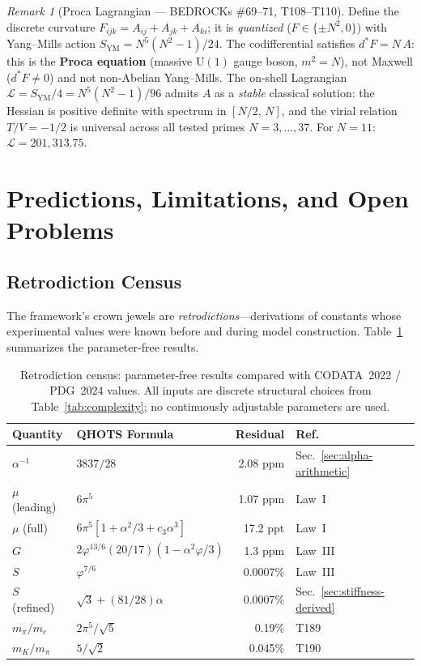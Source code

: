 \documentclass[aps,prd,twocolumn,superscriptaddress,floatfix,nofootinbib]{revtex4-2}
\theoremstyle{definition}
\theoremstyle{remark}
\newtheorem{remark}[theorem]{Remark}
\newcommand{\vp}{\varphi}
\begin{document}
\begin{remark}[Proca Lagrangian --- BEDROCKs \#69--71, T108--T110]
\label{rem:proca}
Define the discrete curvature $F_{ijk}=A_{ij}+A_{jk}+A_{ki}$; it is \emph{quantized} ($F\in\{{\pm}N^2,0\}$) with Yang--Mills action $S_{\mathrm{YM}}=N^5(N^2{-}1)/24$.  The codifferential satisfies $d^*F=N\,A$: this is the \textbf{Proca equation} (massive $\mathrm{U}(1)$ gauge boson, $m^2{=}N$), not Maxwell ($d^*F{\neq}0$) and not non-Abelian Yang--Mills.  The on-shell Lagrangian $\mathcal{L}=S_{\mathrm{YM}}/4=N^5(N^2{-}1)/96$ admits $A$ as a \emph{stable} classical solution: the Hessian is positive definite with spectrum in $[N/2,\,N]$, and the virial relation $T/V=-1/2$ is universal across all tested primes $N=3,\ldots,37$.  For $N{=}11$: $\mathcal{L}=201{,}313.75$.
\end{remark}

\section{Predictions, Limitations, and Open Problems}
\label{sec:predictions-limitations}

\subsection{Retrodiction Census}

The framework's crown jewels are \emph{retrodictions}---derivations of
constants whose experimental values were known before and during model
construction.  Table~\ref{tab:retrodiction-census} summarizes the
parameter-free results.

\begin{table}[ht]
\centering
\caption{Retrodiction census: parameter-free results compared with
  CODATA~2022 / PDG~2024 values.  All inputs are discrete structural
  choices from Table~\ref{tab:complexity}; no continuously adjustable
  parameters are used.}
\label{tab:retrodiction-census}
\begin{tabular}{llrl}
\toprule
Quantity & QHOTS Formula & Residual & Ref.\ \\
\midrule
$\alpha^{-1}$ & $3837/28$ & 2.08 ppm & Sec.~\ref{sec:alpha-arithmetic} \\
$\mu$ (leading) & $6\pi^5$ & 1.07 ppm & Law~I \\
$\mu$ (full) & $6\pi^5[1+\alpha^2/3+c_3\alpha^3]$ & 17.2 ppt & Law~I \\
$G$ & $2\vp^{13/6}(20/17)(1{-}\alpha^2\vp/3)$ & 1.3 ppm & Law~III \\
$S$ & $\vp^{7/6}$ & 0.0007\% & Law~III \\
$S$ (refined) & $\sqrt{3}+(81/28)\alpha$ & 0.0007\% & Sec.~\ref{sec:stiffness-derived} \\
$m_\pi/m_e$ & $2\pi^5/\sqrt{5}$ & 0.19\% & T189 \\
$m_K/m_\pi$ & $5/\sqrt{2}$ & 0.045\% & T190 \\
\bottomrule
\end{tabular}
\end{table}
\end{document}
